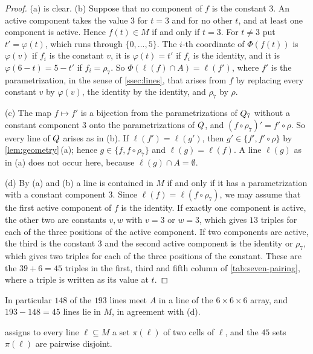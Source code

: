 \begin{proof}
(a) is clear. (b) Suppose that no component of $f$ is the constant $3$. An active component takes the
value $3$ for $t=3$ and for no other $t$, and at least one component is active. Hence $f(t)\in M$ if and
only if $t=3$. For $t\ne 3$ put $t'=\varphi(t)$, which runs through $\{0,\dots,5\}$. The $i$-th
coordinate of $\Phi(f(t))$ is $\varphi(v)$ if $f_i$ is the constant $v$, it is $\varphi(t)=t'$ if $f_i$ is
the identity, and it is $\varphi(6-t)=5-t'$ if $f_i=\rho_7$. So $\Phi(\ell(f)\cap A)=\ell(f')$, where $f'$
is the parametrization, in the sense of \cref{ssec:lines}, that arises from $f$ by replacing every
constant $v$ by $\varphi(v)$, the identity by the identity, and $\rho_7$ by $\rho$.

(c) The map $f\mapsto f'$ is a bijection from the parametrizations of $Q_7$ without a constant
component $3$ onto the parametrizations of $Q$, and $(f\circ\rho_7)'=f'\circ\rho$. So every line of
$Q$ arises as in (b). If $\ell(f')=\ell(g')$, then $g'\in\{f',f'\circ\rho\}$ by
\cref{lem:geometry}\,(a); hence $g\in\{f,f\circ\rho_7\}$ and $\ell(g)=\ell(f)$. A line $\ell(g)$ as in
(a) does not occur here, because $\ell(g)\cap A=\emptyset$.

(d) By (a) and (b) a line is contained in $M$ if and only if it has a parametrization with a constant
component $3$. Since $\ell(f)=\ell(f\circ\rho_7)$, we may assume that the first active component of $f$
is the identity. If exactly one component is active, the other two are constants $v,w$ with $v=3$ or
$w=3$, which gives $13$ triples for each of the three positions of the active component. If two
components are active, the third is the constant $3$ and the second active component is the identity
or $\rho_7$, which gives two triples for each of the three positions of the constant. These are the
$39+6=45$ triples in the first, third and fifth column of \cref{tab:seven-pairing}, where a triple is
written as its value at $t$.
\end{proof}

In particular $148$ of the $193$ lines meet $A$ in a line of the $6\times6\times6$ array, and
$193-148=45$ lines lie in $M$, in agreement with (d).

\begin{lemma}\label{lem:seven-pairing}
 assigns to every line $\ell\subseteq M$ a set $\pi(\ell)$ of two cells of
$\ell$, and the $45$ sets $\pi(\ell)$ are pairwise disjoint.
\end{lemma}

